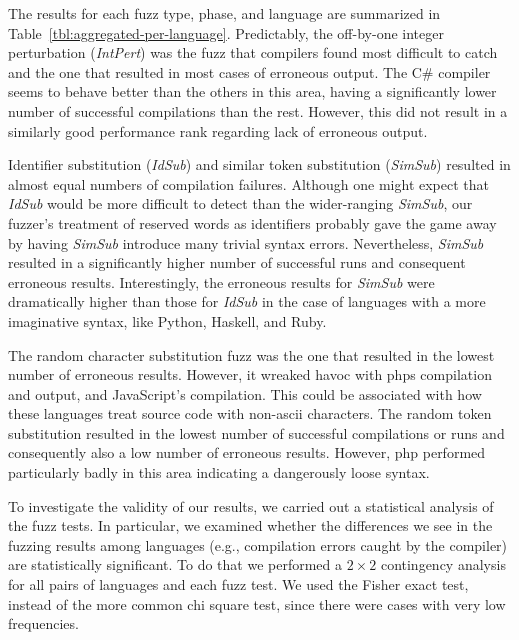 \documentclass[10pt]{sigplanconf}
\begin{document}
The results for each fuzz type, phase, and language are summarized in
Table~\ref{tbl:aggregated-per-language}.
Predictably, the off-by-one integer perturbation ({\em IntPert})
was the fuzz that
compilers found most difficult to catch and the one that resulted
in most cases of erroneous output.
The C\# compiler seems to behave better than the others in this area,
having a significantly lower number of successful compilations than the
rest.
However, this did not result in a similarly good performance rank
regarding lack of erroneous output.

Identifier substitution ({\em IdSub}) and similar token substitution
({\em SimSub}) resulted in almost equal numbers of compilation failures.
Although one might expect that {\em IdSub} would be more difficult
to detect than the wider-ranging {\em SimSub},
our fuzzer's treatment of reserved words as identifiers
probably gave the game away by having {\em SimSub} introduce many
trivial syntax errors.
Nevertheless, {\em SimSub} resulted in a significantly higher number
of successful runs and consequent erroneous results.
Interestingly,
the erroneous results for {\em SimSub} were dramatically higher
than those for {\em IdSub} in the case of
languages with a more imaginative syntax, like Python, Haskell, and Ruby.

The random character substitution fuzz was the one that resulted in
the lowest number of erroneous results. However, it wreaked havoc with
{\sc php}s compilation and output, and JavaScript's compilation. This
could be associated with how these languages treat source code with
non-{\sc ascii} characters. The random token substitution resulted in
the lowest number of successful compilations or runs and consequently
also a low number of erroneous results. However, {\sc php} performed
particularly badly in this area indicating a dangerously loose syntax.

To investigate the validity of our results, we carried out a
statistical analysis of the fuzz tests. In particular, we examined
whether the differences we see in the fuzzing results among languages
(e.g., compilation errors caught by the compiler) are statistically
significant. To do that we performed a $2\times 2$ contingency
analysis for all pairs of languages and each fuzz test. We used the
Fisher exact test, instead of the more common chi square test, since
there were cases with very low frequencies. 
\end{document}
